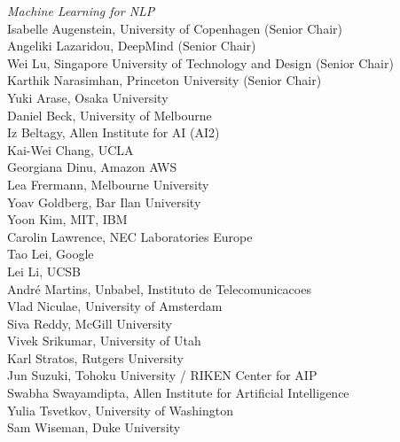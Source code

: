 \emph{Machine Learning for NLP} \\
\hspace*{0.2in} Isabelle Augenstein, University of Copenhagen (Senior Chair)\\
\hspace*{0.2in} Angeliki Lazaridou, DeepMind (Senior Chair)\\
\hspace*{0.2in} Wei Lu, Singapore University of Technology and Design (Senior Chair)\\
\hspace*{0.2in} Karthik Narasimhan, Princeton University (Senior Chair)\\
\hspace*{0.2in} Yuki Arase, Osaka University\\
\hspace*{0.2in} Daniel Beck, University of Melbourne\\
\hspace*{0.2in} Iz Beltagy, Allen Institute for AI (AI2)\\
\hspace*{0.2in} Kai-Wei Chang, UCLA\\
\hspace*{0.2in} Georgiana Dinu, Amazon AWS\\
\hspace*{0.2in} Lea Frermann, Melbourne University\\
\hspace*{0.2in} Yoav Goldberg, Bar Ilan University\\
\hspace*{0.2in} Yoon Kim, MIT, IBM\\
\hspace*{0.2in} Carolin Lawrence, NEC Laboratories Europe\\
\hspace*{0.2in} Tao Lei, Google\\
\hspace*{0.2in} Lei Li, UCSB\\
\hspace*{0.2in} Andr\'e Martins, Unbabel, Instituto de Telecomunicacoes\\
\hspace*{0.2in} Vlad Niculae, University of Amsterdam\\
\hspace*{0.2in} Siva Reddy, McGill University\\
\hspace*{0.2in} Vivek Srikumar, University of Utah\\
\hspace*{0.2in} Karl Stratos, Rutgers University\\
\hspace*{0.2in} Jun Suzuki, Tohoku University / RIKEN Center for AIP\\
\hspace*{0.2in} Swabha Swayamdipta, Allen Institute for Artificial Intelligence\\
\hspace*{0.2in} Yulia Tsvetkov, University of Washington\\
\hspace*{0.2in} Sam Wiseman, Duke University\\

